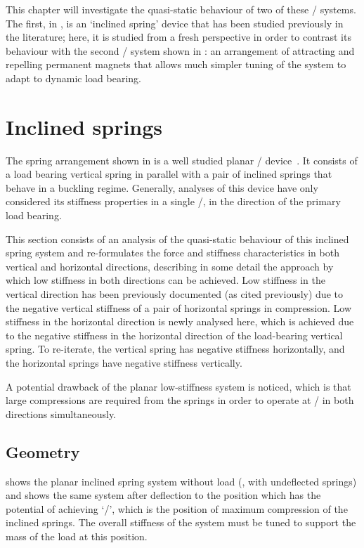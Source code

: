 \documentclass[11pt,a4paper]{memoir}
\begin{document}
This chapter will investigate the quasi-static behaviour of two of these \qzs/ systems.
The first, in , is an `inclined spring' device that has been studied previously in the literature; here, it is studied from a fresh perspective in order to contrast its behaviour with the second \qzs/ system shown in : an arrangement of attracting and repelling permanent magnets that allows much simpler tuning of the system to adapt to dynamic load bearing.


\section{Inclined springs}

The spring arrangement shown in  is a well studied planar \qzs/ device~\cite{molyneux1957,alabuzhev1989,carrella2006,carrella2007-jsv,carrella2008-thesis,carrella2009-jsv}.
It consists of a load bearing vertical spring in parallel with a pair of inclined springs that behave in a buckling regime.
Generally, analyses of this device have only considered its stiffness properties in a single \dof/, in the direction of the primary load bearing.

This section consists of an analysis of the quasi-static behaviour of this inclined spring system and re-formulates the force and stiffness characteristics in both vertical and horizontal directions, describing in some detail the approach by which low stiffness in both directions can be achieved.
Low stiffness in the vertical direction has been previously documented (as cited previously) due to the negative vertical stiffness of a pair of horizontal springs in compression.
Low stiffness in the horizontal direction is newly analysed here, which is achieved due to the negative stiffness in the horizontal direction of the load-bearing vertical spring.
To re-iterate, the vertical spring has negative stiffness horizontally, and the horizontal springs have negative stiffness vertically.

A potential drawback of the planar low-stiffness system is noticed, which is that large compressions are required from the springs in order to operate at \qzs/ in both directions simultaneously.

\subsection{Geometry}

 shows the planar inclined spring system without load (\ie,
with undeflected springs) and  shows the same system after
deflection to the position which has the potential of achieving `\qzs/', which
is the position of maximum compression of the inclined springs. The overall
stiffness of the system must be tuned to support the mass of the load at this
position.
\end{document}
